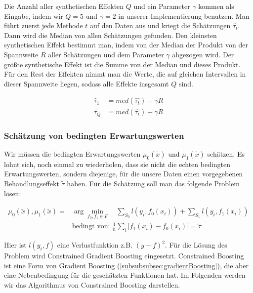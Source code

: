 \documentclass[12pt,a4paper,twoside]{scrartcl}
\numberwithin{equation}{section}
\begin{document}
\noindent
Die Anzahl aller synthetischen Effekten $Q$ und ein Parameter $\gamma$ kommen als Eingabe, indem wir $Q=5$ und $\gamma = 2$ in unserer Implementierung benutzen. Man führt zuerst jede Methode $t$ auf den Daten aus und kriegt die Schätzungen $\hat{\tau_t}$. Dann wird die Median von allen Schätzungen gefunden. Den kleinsten synthetischen Effekt bestimmt man, indem von der Median der Produkt von der Spannweite $R$ aller Schätzungen und dem Parameter $\gamma$ abgezogen wird. Der größte synthetische Effekt ist die Summe von der Median und dieses Produkt. Für den Rest der Effekten nimmt man die Werte, die auf gleichen Intervallen in dieser Spannweite liegen, sodass alle Effekte insgesamt $Q$ sind\cite{schuler2017synth}.

\begin{equation}\label{eq:3.5}
\begin{split}
 \tilde{\tau_1} &= med(\hat{\tau_t}) - \gamma R\\
 \tilde{\tau_Q} &= med(\hat{\tau_t}) + \gamma R
\end{split}
\end{equation}
	
\subsubsection{Schätzung von bedingten Erwartungswerten}\label{subsubsec:schätzungBedingtenErwartungswerten}
Wir müssen die bedingten Erwartungswerten $\mu_0(\tilde{x})$ und $\mu_1(\tilde{x})$ schätzen. Es lohnt sich, noch einmal zu wiederholen, dass sie nicht die echten bedingten Erwartungswerten, sondern diejenige, für die unsere Daten einen vorgegebenen Behandlungseffekt $\tilde{\tau}$ haben. Für die Schätzung soll man das folgende Problem lösen\cite{schuler2017synth}:\par

\begin{equation}\label{eq:3.6}
\begin{split}
 \mu_0(\tilde{x}),\mu_1(\tilde{x}) = &\arg\min_{f_0,f_1 \in F} \quad \sum_{S_0} l(y_i,f_0(x_i)) + \sum_{S_1} l(y_i,f_1(x_i))\\
 &\text{bedingt von: } \frac{1}{n} \sum_i \big [f_1(x_i) - f_0(x_i) \big ] = \tilde{\tau}
\end{split}
\end{equation}

\noindent
Hier ist $l(y_i,f)$  eine Verlustfunktion z.B. $(y-f)^2$. Für die Lösung des Problem wird Constrained Gradient Boosting eingesetzt. Constrained Boosting ist eine Form von Gradient Boosting (\ref{subsubsubsec:gradientBoosting}), die aber eine Nebenbedingung für die geschätzten Funktionen hat. Im Folgenden werden wir das Algorithmus von Constrained Boosting darstellen\cite{schuler2017synth}.\par
 
\end{document}
